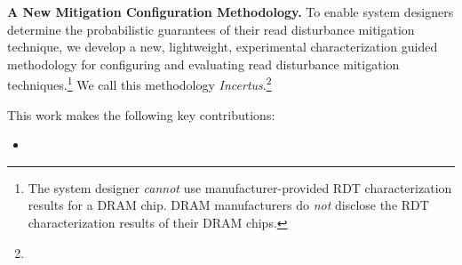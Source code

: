 

\noindent
\textbf{A New Mitigation Configuration Methodology.}
To enable system designers determine the probabilistic guarantees of their read disturbance
mitigation technique, 
we develop a new, lightweight, experimental characterization guided methodology 
for configuring and evaluating read disturbance mitigation techniques.\footnote{The
system designer \emph{cannot} use manufacturer-provided RDT characterization results for a DRAM chip.
DRAM manufacturers do \emph{not} disclose the RDT characterization results of their DRAM chips.} 
We call this methodology \emph{Incertus}.\footnote{} 

This work makes the following key contributions:
\begin{itemize}
    \item 
\end{itemize}